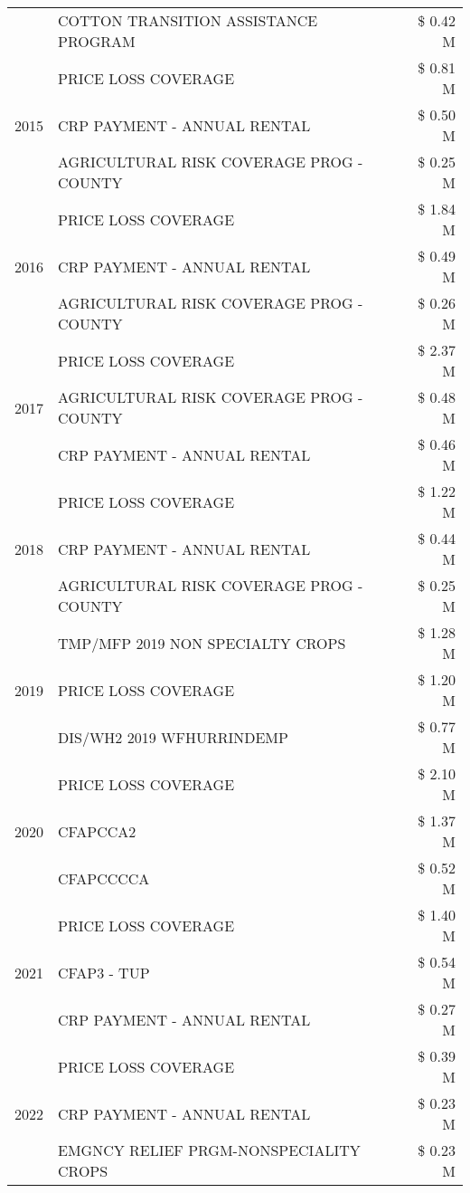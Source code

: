 \begin{tabular}{llr}
 & COTTON TRANSITION ASSISTANCE PROGRAM & \$ 0.42 M \\
\cline{1-3}
\multirow[t]{3}{*}{2015} & PRICE LOSS COVERAGE & \$ 0.81 M \\
 & CRP PAYMENT - ANNUAL RENTAL & \$ 0.50 M \\
 & AGRICULTURAL RISK COVERAGE PROG - COUNTY & \$ 0.25 M \\
\cline{1-3}
\multirow[t]{3}{*}{2016} & PRICE LOSS COVERAGE & \$ 1.84 M \\
 & CRP PAYMENT - ANNUAL RENTAL & \$ 0.49 M \\
 & AGRICULTURAL RISK COVERAGE PROG - COUNTY & \$ 0.26 M \\
\cline{1-3}
\multirow[t]{3}{*}{2017} & PRICE LOSS COVERAGE & \$ 2.37 M \\
 & AGRICULTURAL RISK COVERAGE PROG - COUNTY & \$ 0.48 M \\
 & CRP PAYMENT - ANNUAL RENTAL & \$ 0.46 M \\
\cline{1-3}
\multirow[t]{3}{*}{2018} & PRICE LOSS COVERAGE & \$ 1.22 M \\
 & CRP PAYMENT - ANNUAL RENTAL & \$ 0.44 M \\
 & AGRICULTURAL RISK COVERAGE PROG - COUNTY & \$ 0.25 M \\
\cline{1-3}
\multirow[t]{3}{*}{2019} & TMP/MFP 2019 NON SPECIALTY CROPS & \$ 1.28 M \\
 & PRICE LOSS COVERAGE & \$ 1.20 M \\
 & DIS/WH2 2019 WFHURRINDEMP & \$ 0.77 M \\
\cline{1-3}
\multirow[t]{3}{*}{2020} & PRICE LOSS COVERAGE & \$ 2.10 M \\
 & CFAPCCA2 & \$ 1.37 M \\
 & CFAPCCCCA & \$ 0.52 M \\
\cline{1-3}
\multirow[t]{3}{*}{2021} & PRICE LOSS COVERAGE & \$ 1.40 M \\
 & CFAP3 - TUP & \$ 0.54 M \\
 & CRP PAYMENT - ANNUAL RENTAL & \$ 0.27 M \\
\cline{1-3}
\multirow[t]{3}{*}{2022} & PRICE LOSS COVERAGE & \$ 0.39 M \\
 & CRP PAYMENT - ANNUAL RENTAL & \$ 0.23 M \\
 & EMGNCY RELIEF PRGM-NONSPECIALITY CROPS & \$ 0.23 M \\
\cline{1-3}
\bottomrule
\end{tabular}
